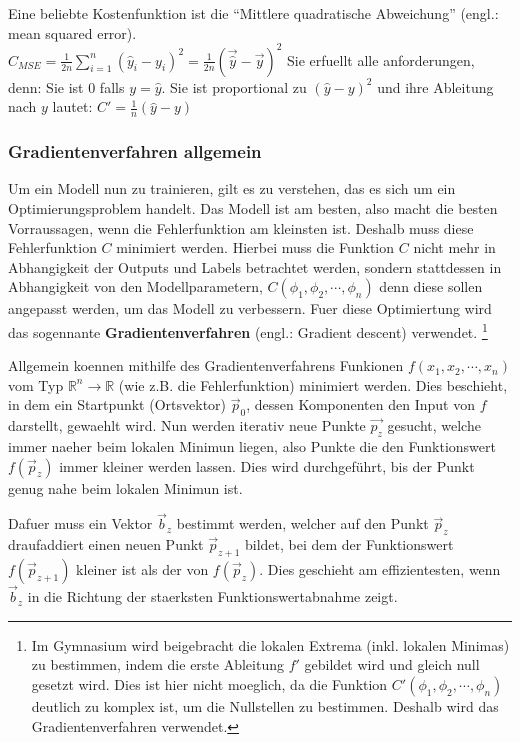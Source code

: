 \documentclass[../main]{subfiles}
\begin{document}
Eine beliebte Kostenfunktion ist die ``Mittlere quadratische Abweichung'' (engl.: mean squared error).\\
$\displaystyle C_{MSE} = \frac{1}{2n}\sum_{i=1}^{n}(\hat{y}_i - y_i)^2 = \frac{1}{2n}(\vec{\hat{y}} - \vec{y})^2$
Sie erfuellt alle anforderungen, denn:
Sie ist $0$ falls $y=\hat{y}$. Sie ist proportional zu $(\hat{y}-y)^2$ und ihre Ableitung nach $y$ lautet: $C'=\frac{1}{n}(\hat{y}-y)$


\subsubsection{Gradientenverfahren allgemein}
Um ein Modell nun zu trainieren, gilt es zu verstehen, das es sich um ein Optimierungsproblem handelt.
Das Modell ist am besten, also macht die besten Vorraussagen, wenn die Fehlerfunktion am kleinsten ist.
Deshalb muss diese Fehlerfunktion $C$ minimiert werden.
Hierbei muss die Funktion $C$ nicht mehr in Abhangigkeit der Outputs und Labels betrachtet werden, sondern stattdessen in Abhangigkeit von den Modellparametern,
$C(\phi_1, \phi_2, \cdots, \phi_n)$ denn diese sollen angepasst werden, um das Modell zu verbessern.
Fuer diese Optimiertung wird das sogennante \textbf{Gradientenverfahren} (engl.: Gradient descent) verwendet.
\footnote{
    Im Gymnasium wird beigebracht die lokalen Extrema (inkl. lokalen Minimas) zu bestimmen, indem die erste Ableitung $f'$ gebildet wird und  gleich null gesetzt wird.
    Dies ist hier nicht moeglich, da die Funktion $C'(\phi_1,\phi_2, \cdots, \phi_n)$ deutlich zu komplex ist, um die Nullstellen zu bestimmen. Deshalb wird das Gradientenverfahren verwendet.
}\par
\medskip
Allgemein koennen mithilfe des Gradientenverfahrens Funkionen $f(x_1, x_2, \cdots, x_n)$ vom Typ $\mathbb{R}^n \to \mathbb{R}$ (wie z.B. die Fehlerfunktion) minimiert werden.
Dies beschieht, in dem ein Startpunkt (Ortsvektor) $\vec{p}_0$, dessen Komponenten den Input von $f$ darstellt, gewaehlt wird.
Nun werden iterativ neue Punkte $\vec{p_z}$ gesucht, welche immer naeher beim lokalen Minimun liegen, also Punkte die den Funktionswert $f(\vec{p}_z)$ immer kleiner werden lassen.
Dies wird durchgeführt, bis der Punkt genug nahe beim lokalen Minimun ist.
\par
\medskip
Dafuer muss ein Vektor $\vec{b}_z$ bestimmt werden, welcher auf den Punkt $\vec{p}_z$ draufaddiert einen neuen Punkt $\vec{p}_{z+1}$ bildet,
bei dem der Funktionswert $f(\vec{p}_{z+1})$ kleiner ist als der von $f(\vec{p}_z)$.
Dies geschieht am effizientesten, wenn $\vec{b}_z$ in die Richtung der staerksten Funktionswertabnahme zeigt.
\end{document}
